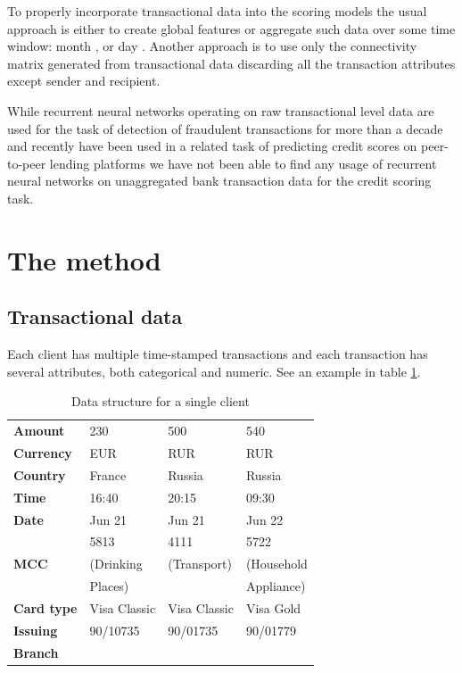 \documentclass{sigkddExp}
\begin{document}
To properly incorporate transactional data into the scoring models the usual approach is either to create global features \cite{chi2012hybrid} or aggregate such data over some time window: month \cite{khandani2010consumer}, \cite{bellotti2013forecasting} or day \cite{KVAMME2018207}. Another approach is to use only the connectivity matrix generated from transactional data discarding all the transaction attributes except sender and recipient\cite{RePEc}.

While recurrent neural networks operating on raw transactional level data are used for the task of detection of fraudulent transactions for more than a decade \cite{fraud_lstm} and recently have been used in a related task of predicting credit scores on peer-to-peer lending platforms \cite{zhang2017credit} we have not been able to find any usage of recurrent neural networks on unaggregated bank transaction data for the credit scoring task.

\section{The method}

\subsection{Transactional data}

Each client has multiple time-stamped transactions and each transaction has several attributes, both categorical and numeric. See an example in table \ref{tab1}. 

\begin{table}[h]
\caption{Data structure for a single client}
\begin{tabular}{ | l |  l l l | }
\hline
\textbf{Amount} & 230 & 500 & 540 \\
\textbf{Currency} & EUR & RUR & RUR \\
\textbf{Country} & France & Russia & Russia \\
\textbf{Time} & 16:40 & 20:15 & 09:30 \\
\textbf{Date} & Jun 21 & Jun 21 & Jun 22 \\
 & 5813 & 4111 & 5722 \\
\textbf{MCC} & (Drinking & (Transport) & (Household \\
 & Places) &  & Appliance) \\
\textbf{Card type} & Visa Classic & Visa Classic & Visa Gold \\
\textbf{Issuing} & 90/10735 & 90/01735 & 90/01779 \\
\textbf{Branch} &&& \\
\hline
\end{tabular}
\label{tab1}
\end{table}
\end{document}
